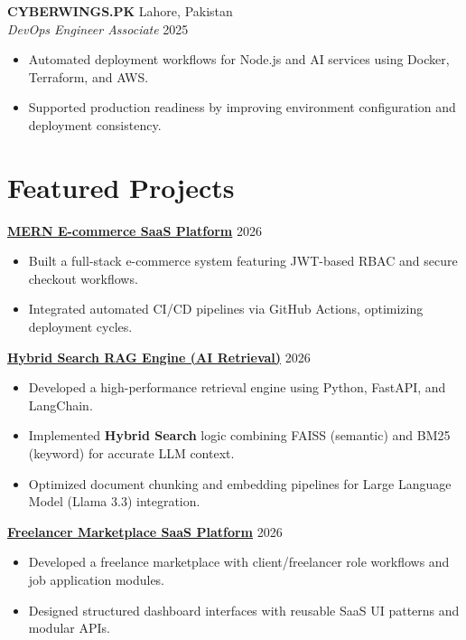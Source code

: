 \documentclass[a4paper,11pt]{article}
\begin{document}
\textbf{CYBERWINGS.PK} \hfill Lahore, Pakistan \\
\textit{DevOps Engineer Associate} \hfill 2025
\begin{itemize}
    \item Automated deployment workflows for Node.js and AI services using Docker, Terraform, and AWS.
    \item Supported production readiness by improving environment configuration and deployment consistency.
\end{itemize}

\section{Featured Projects}

\textbf{\href{https://ecommerece-mern-web.vercel.app}{MERN E-commerce SaaS Platform}} \hfill 2026 \\
\begin{itemize}
    \item Built a full-stack e-commerce system featuring JWT-based RBAC and secure checkout workflows.
    \item Integrated automated CI/CD pipelines via GitHub Actions, optimizing deployment cycles.
\end{itemize}

\textbf{\href{https://github.com/ihamidch/Hybrid-Search-RAG-Engine}{Hybrid Search RAG Engine (AI Retrieval)}} \hfill 2026 \\
\begin{itemize}
    \item Developed a high-performance retrieval engine using Python, FastAPI, and LangChain.
    \item Implemented \textbf{Hybrid Search} logic combining FAISS (semantic) and BM25 (keyword) for accurate LLM context.
    \item Optimized document chunking and embedding pipelines for Large Language Model (Llama 3.3) integration.
\end{itemize}

\textbf{\href{https://frontend-kappa-amber-29.vercel.app}{Freelancer Marketplace SaaS Platform}} \hfill 2026 \\
\begin{itemize}
    \item Developed a freelance marketplace with client/freelancer role workflows and job application modules.
    \item Designed structured dashboard interfaces with reusable SaaS UI patterns and modular APIs.
\end{itemize}
\end{document}

